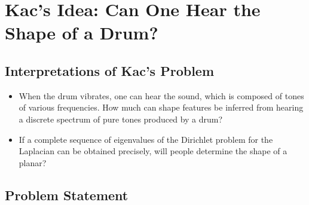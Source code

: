 

\section{Kac’s Idea: Can One Hear the Shape of a Drum? \cite{kac1966can}}



  \subsection{Interpretations of Kac's Problem}

     \begin{itemize}
       \item When the drum vibrates, one can hear the sound, which is composed of tones of various frequencies. How much can shape features be inferred from hearing a discrete spectrum of pure tones produced by a drum?
       \item If a complete sequence of eigenvalues of the Dirichlet problem for the Laplacian can be obtained precisely, will people determine the shape of a planar?
     \end{itemize}




    \subsection{Problem Statement}

